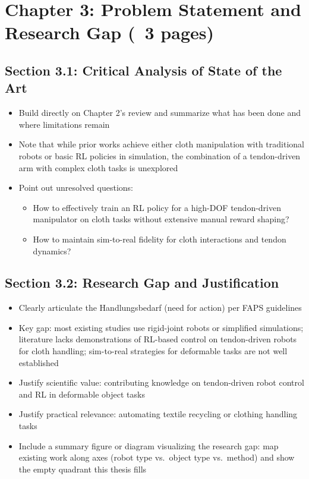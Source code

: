 \section{Chapter 3: Problem Statement and Research Gap (~3 pages)}

\subsection{Section 3.1: Critical Analysis of State of the Art}
\begin{itemize}
    \item Build directly on Chapter 2's review and summarize what has been done and where limitations remain
    \item Note that while prior works achieve either cloth manipulation with traditional robots or basic RL policies in simulation, the combination of a tendon-driven arm with complex cloth tasks is unexplored
    \item Point out unresolved questions:
    \begin{itemize}
        \item How to effectively train an RL policy for a high-DOF tendon-driven manipulator on cloth tasks without extensive manual reward shaping?
        \item How to maintain sim-to-real fidelity for cloth interactions and tendon dynamics?
    \end{itemize}
\end{itemize}

\subsection{Section 3.2: Research Gap and Justification}
\begin{itemize}
    \item Clearly articulate the Handlungsbedarf (need for action) per FAPS guidelines
    \item Key gap: most existing studies use rigid-joint robots or simplified simulations; literature lacks demonstrations of RL-based control on tendon-driven robots for cloth handling; sim-to-real strategies for deformable tasks are not well established
    \item Justify scientific value: contributing knowledge on tendon-driven robot control and RL in deformable object tasks
    \item Justify practical relevance: automating textile recycling or clothing handling tasks
    \item Include a summary figure or diagram visualizing the research gap: map existing work along axes (robot type vs.\ object type vs.\ method) and show the empty quadrant this thesis fills
\end{itemize}

